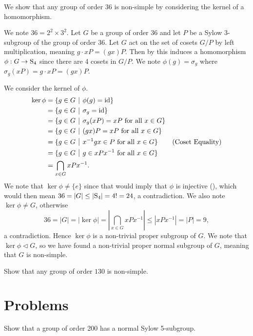 \begin{example}\label{example-using-kernel-to-show-non-simple}
    We show that any group of order 36 is non-simple by considering the kernel of a homomorphism.

    We note $36 = 2^2 \times 3^2$. Let $G$ be a group of order 36 and let $P$ be a Sylow 3-subgroup of the group of order 36. Let $G$ act on the set of cosets $G/P$ by left multiplication, meaning $g \cdot xP = (gx)P$. Then by  this induces a homomorphism $\phi: G \to \mathrm{S}_{4}$ since there are 4 cosets in $G/P$. We note $\phi(g) = \sigma_g$ where $\sigma_g(xP) = g\cdot xP = (gx)P$.

    We consider the kernel of $\phi$.
    \begin{align*}
        \ker\phi &= \{g \in G \vert \phi(g) = \id\}\\
        &= \{g \in G \vert \sigma_g = \id\}\\
        &= \{g \in G \vert \sigma_g(xP) = xP \text{ for all } x \in G\}\\
        &= \{g \in G \vert (gx)P = xP \text{ for all } x \in G\}\\
        &= \{g \in G \vert x^{-1}gx \in P \text{ for all } x \in G\} & (\text{Coset Equality})\\
        &= \{g \in G \vert g \in xPx^{-1} \text{ for all } x \in G\}\\
        &= \bigcap_{x \in G} xPx^{-1}.
    \end{align*}
    We note that $\ker\phi \neq \{e\}$ since that would imply that $\phi$ is injective (), which would then mean $36 = |G| \leq |\mathrm{S}_{4}| = 4! = 24$, a contradiction. We also note $\ker\phi \neq G$, otherwise
    \[
        36 = |G| = |\ker\phi| = \left|\bigcap_{x \in G} xPx^{-1}\right| \leq |xPx^{-1}| = |P| = 9,
    \]
    a contradiction. Hence $\ker\phi$ is a non-trivial proper subgroup of $G$. We note that $\ker\phi \lhd G$, so we have found a non-trivial proper normal subgroup of $G$, meaning that $G$ is non-simple.
\end{example}

\begin{exercise}
    Show that any group of order $130$ is non-simple.
\end{exercise}

\newpage

\section{Problems}
\begin{problem}
    Show that a group of order 200 has a normal Sylow 5-subgroup.
\end{problem}

